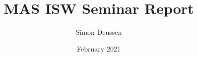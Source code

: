 \documentclass{report}
\title{MAS ISW Seminar Report}
\date{February 2021}
\author{Simon Deussen}
\begin{document}
\begin{titlepage}
    \maketitle
\end{titlepage}


\newpage
\tableofcontents
\newpage




\newpage


\end{document}
